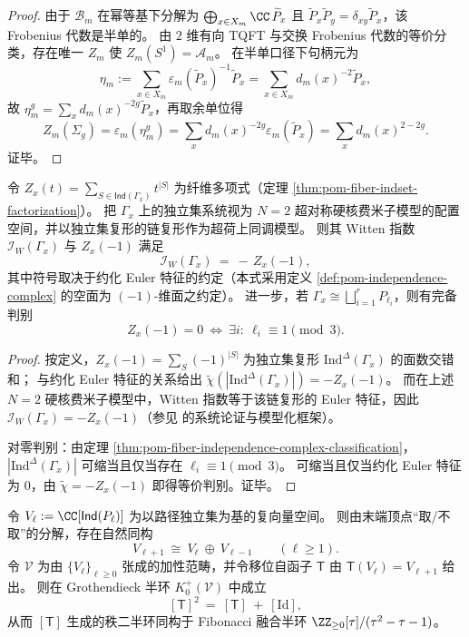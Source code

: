 \begin{proof}
由于 \(\mathcal B_m\) 在幂等基下分解为 \(\bigoplus_{x\in X_m}\CC\,\widetilde P_x\) 且 \(\widetilde P_x\widetilde P_y=\delta_{xy}\widetilde P_x\)，该 Frobenius 代数是半单的。
由 \(2\) 维有向 TQFT 与交换 Frobenius 代数的等价分类，存在唯一 \(Z_m\) 使 \(Z_m(S^1)=\mathcal A_m\)。
在半单口径下句柄元为
\[
\eta_m:=\sum_{x\in X_m}\varepsilon_m(\widetilde P_x)^{-1}\widetilde P_x=\sum_{x\in X_m}d_m(x)^{-2}\widetilde P_x,
\]
故 \(\eta_m^g=\sum_x d_m(x)^{-2g}\widetilde P_x\)，再取余单位得
\[
Z_m(\Sigma_g)=\varepsilon_m(\eta_m^g)=\sum_x d_m(x)^{-2g}\varepsilon_m(\widetilde P_x)=\sum_x d_m(x)^{2-2g}.
\]
证毕。
\end{proof}

\begin{proposition}\label{prop:pom-fiber-witten-index-zx-minus-one}
令 \(Z_x(t)=\sum_{S\in\mathsf{Ind}(\Gamma_x)}t^{|S|}\) 为纤维多项式（定理 \ref{thm:pom-fiber-indset-factorization}）。
把 \(\Gamma_x\) 上的独立集系统视为 \(N=2\) 超对称硬核费米子模型的配置空间，并以独立集复形的链复形作为超荷上同调模型。
则其 Witten 指数 \(\mathcal I_W(\Gamma_x)\) 与 \(Z_x(-1)\) 满足
\[
\mathcal I_W(\Gamma_x)\ =\ -\,Z_x(-1),
\]
其中符号取决于约化 Euler 特征的约定（本式采用定义 \ref{def:pom-independence-complex} 的空面为 \((-1)\)-维面之约定）。
进一步，若 \(\Gamma_x\cong\bigsqcup_{i=1}^r P_{\ell_i}\)，则有完备判别
\[
Z_x(-1)=0\ \Longleftrightarrow\ \exists i:\ \ell_i\equiv 1\pmod 3.
\]
\end{proposition}

\begin{proof}
按定义，\(Z_x(-1)=\sum_{S}(-1)^{|S|}\) 为独立集复形 \(\mathrm{Ind}^{\Delta}(\Gamma_x)\) 的面数交错和；
与约化 Euler 特征的关系给出
\(
\widetilde\chi(|\mathrm{Ind}^{\Delta}(\Gamma_x)|)=-Z_x(-1)
\)。
而在上述 \(N=2\) 硬核费米子模型中，Witten 指数等于该链复形的 Euler 特征，因此 \(\mathcal I_W(\Gamma_x)=-Z_x(-1)\)（参见 \cite{FendleySchoutensDeBoer2003LatticeModelsN2Supersymmetry} 的系统论证与模型化框架）。

对零判别：由定理 \ref{thm:pom-fiber-independence-complex-classification}，
\(|\mathrm{Ind}^{\Delta}(\Gamma_x)|\) 可缩当且仅当存在 \(\ell_i\equiv 1\pmod 3\)。
可缩当且仅当约化 Euler 特征为 \(0\)，由 \(\widetilde\chi=-Z_x(-1)\) 即得等价判别。证毕。
\end{proof}



\begin{proposition}[由路径独立集诱导的秩二融合半环]\label{prop:pom-fiber-grothendieck-fibonacci-fusion-semiring}
令 \(V_\ell:=\CC[\mathsf{Ind}(P_\ell)]\) 为以路径独立集为基的复向量空间。
则由末端顶点“取/不取”的分解，存在自然同构
\[
V_{\ell+1}\ \cong\ V_\ell\ \oplus\ V_{\ell-1}\qquad(\ell\ge 1).
\]
令 \(\mathcal V\) 为由 \(\{V_\ell\}_{\ell\ge 0}\) 张成的加性范畴，并令移位自函子 \(\mathsf T\) 由 \(\mathsf T(V_\ell)=V_{\ell+1}\) 给出。
则在 Grothendieck 半环 \(K_0^+(\mathcal V)\) 中成立
\[
[\mathsf T]^2\ =\ [\mathsf T]\ +\ [\mathrm{Id}],
\]
从而 \([\mathsf T]\) 生成的秩二半环同构于 Fibonacci 融合半环 \(\ZZ_{\ge 0}[\tau]/(\tau^2-\tau-1)\)。
\end{proposition}

